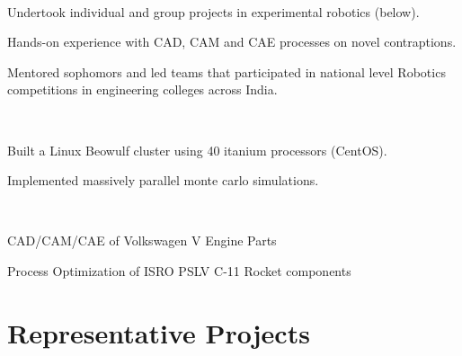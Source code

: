 \documentclass[]{deedy-resume-openfont}
\begin{document}
\begin{minipage}[t]{0.66\textwidth}
\\
\begin{tightemize}
\item Undertook individual and group projects in experimental robotics (below).
\item Hands-on experience with CAD, CAM and CAE processes on novel contraptions.
\item Mentored sophomors and led teams that participated in national level Robotics competitions in engineering colleges across India.
\end{tightemize}
\sectionsep


\\
\begin{tightemize}
\item Built a Linux Beowulf cluster using 40 itanium processors (CentOS).
\item Implemented massively parallel monte carlo simulations.
\end{tightemize}
\sectionsep


\\
\begin{tightemize}\item CAD/CAM/CAE of Volkswagen V Engine Parts
\item Process Optimization of ISRO PSLV C-11 Rocket components
\end{tightemize}
\sectionsep



\newcommand\Topstrut{\rule{0pt}{2.1ex}}
\newcommand\Bottomstrut{\rule[-0.6ex]{0pt}{0pt}}

\section{Representative Projects}
\begin{tabular}{rll}


\end{tabular}
\end{minipage}
\end{document}
